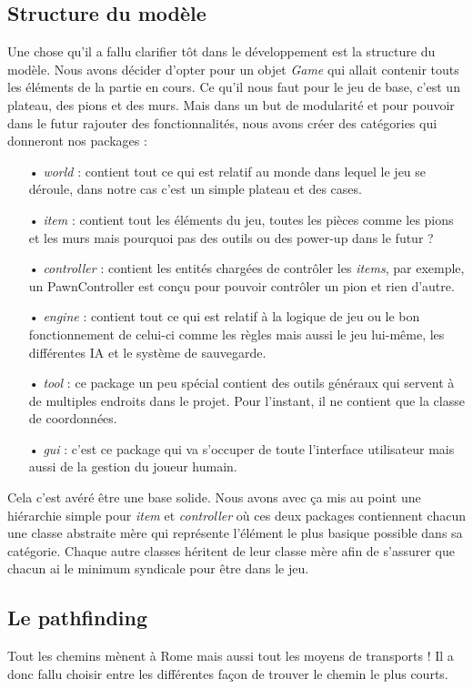 \documentclass[a4paper, 12pt]{article}
\begin{document}
\subsection{Structure du modèle}
Une chose qu'il a fallu clarifier tôt dans le développement est la structure du modèle.
Nous avons décider d'opter pour un objet \textit{Game} qui allait contenir touts les éléments de la partie en cours. Ce qu'il nous faut pour le jeu de base, c'est un plateau, des pions et des murs. Mais dans un but de modularité et pour pouvoir dans le futur rajouter des fonctionnalités, nous avons créer des catégories qui donneront nos packages :
\begin{itemize}
\item[•] \textit{world} : contient tout ce qui est relatif au monde dans lequel le jeu se déroule, dans notre cas c'est un simple plateau et des cases.
\item[•] \textit{item} : contient tout les éléments du jeu, toutes les pièces comme les pions et les murs mais pourquoi pas des outils ou des power-up dans le futur ?
\item[•] \textit{controller} : contient les entités chargées de contrôler les \textit{items}, par exemple, un PawnController est conçu pour pouvoir contrôler un pion et rien d'autre.
\item[•] \textit{engine} : contient tout ce qui est relatif à la logique de jeu ou le bon fonctionnement de celui-ci comme les règles mais aussi le jeu lui-même, les différentes IA et le système de sauvegarde.
\item[•] \textit{tool} : ce package un peu spécial contient des outils généraux qui servent à de multiples endroits dans le projet. Pour l'instant, il ne contient que la classe de coordonnées.
\item[•] \textit{gui} : c'est ce package qui va s'occuper de toute l'interface utilisateur mais aussi de la gestion du joueur humain.
\end{itemize}
Cela c'est avéré être une base solide. Nous avons avec ça mis au point une hiérarchie simple pour \textit{item} et \textit{controller} où ces deux packages contiennent chacun une classe abstraite mère qui représente l'élément le plus basique possible dans sa catégorie. Chaque autre classes héritent de leur classe mère afin de s'assurer que chacun ai le minimum syndicale pour être dans le jeu.

\subsection{Le pathfinding}
Tout les chemins mènent à Rome mais aussi tout les moyens de transports ! Il a donc fallu choisir entre les différentes façon de trouver le chemin le plus courts. \\
\end{document}
